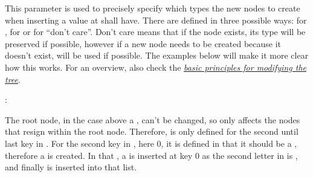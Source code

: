 \documentclass[a4paper,10pt,english]{sphinxmanual}
\begin{document}
\sphinxAtStartPar
This parameter is used to precisely specify which types the new nodes to create when inserting a value at {\hyperref[\detokenize{README:the-path-parameter}]{\emph{}}} shall have. There are defined in three possible ways:  for ,  for  or  for “don’t care”. Don’t care means that if the node exists, its type will be preserved if possible, however if a new node needs to be created because it doesn’t exist, {\hyperref[\detokenize{README:default_node_type}]{\emph{}}} will be used if possible. The examples below will make it more clear how this works. For an overview, also check the {\hyperref[\detokenize{README:basic-principles-for-modifying-the-tree}]{\emph{basic principles for modifying the tree}}}.

\sphinxAtStartPar
{}:

\begin{sphinxVerbatim}[commandchars=\\\{\},numbers=left,firstnumber=1,stepnumber=1]
  
  
    
\end{sphinxVerbatim}

\sphinxAtStartPar
The root node, in the case above a , can’t be changed, so  only affects the nodes that resign within the root node. Therefore,  is only defined for the second until last key in {\hyperref[\detokenize{README:the-path-parameter}]{\emph{}}}. For the second key in , here 0, it is defined in  that it should be a , therefore a  is created. In that , a  is inserted at key 0 as the second letter in  is , and finally  is inserted into that \textasciigrave{}list.
\end{document}
